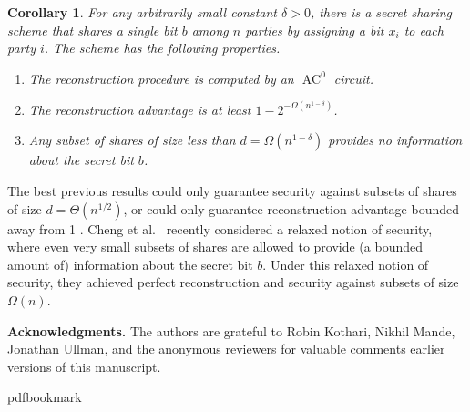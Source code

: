 \documentclass[11pt]{article}
\numberwithin{equation}{section}
\newtheorem{corollary}[theorem]{Corollary}
\theoremstyle{definition}
\theoremstyle{plain}
\begin{document}
\begin{corollary} \label{cor:secret-sharing}
	For any arbitrarily small constant $\delta > 0$, there is a secret sharing scheme 
	that shares a single bit $b$ among $n$ parties by assigning a bit $x_i$ to each party $i$. The scheme has the following properties.
\begin{enumerate}
\item The reconstruction procedure is computed by an $\operatorname{AC}^0$ circuit.
\item The reconstruction advantage is at least $1-2^{-\Omega(n^{1-\delta})}$.
\item Any subset of shares of size less than $d = \Omega(n^{1-\delta})$ provides no information about the secret bit $b$.
\end{enumerate}
\end{corollary}

The best previous results could only guarantee security against subsets of shares of size $d=\Theta(n^{1/2})$,
or could only guarantee reconstruction advantage bounded away from 1 \cite{viola, adegsurj}. Cheng et al.~\cite{cheng2017near} recently considered
a relaxed notion of security, where even very small subsets of shares are allowed to 
provide (a bounded amount of) information about the secret bit $b$. Under this relaxed notion of security, they achieved perfect reconstruction
and security against subsets of size $\Omega(n)$. 

\medskip \noindent \textbf{Acknowledgments.} The authors are grateful to Robin Kothari, Nikhil Mande, Jonathan Ullman, and the anonymous reviewers
for valuable comments earlier versions of this manuscript. 




\newcommand{\prelim}{Preliminary version in\ }
\providecommand{\bibhead}[1]{}
\expandafter\ifx\csname pdfbookmark\endcsname\relax%
  \providecommand{\tocrefpdfbookmark}{}
\else\providecommand{\tocrefpdfbookmark}{%
   \hypertarget{tocreferences}{}%
   \pdfbookmark[1]{References}{tocreferences}}%
\fi
\end{document}
